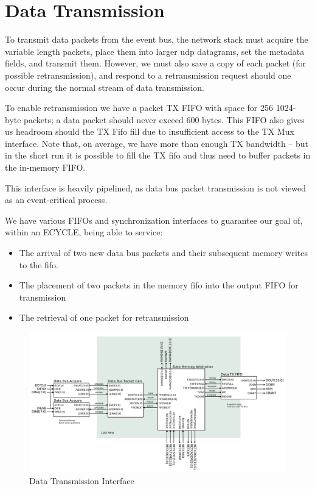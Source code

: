 \section{Data Transmission}

To transmit data packets from the event bus, the network stack must
acquire the variable length packets, place them into larger udp
datagrams, set the metadata fields, and transmit them. However, we
must also save a copy of each packet (for possible retransmission),
and respond to a retransmission request should one occur during the
normal stream of data transmission.

To enable retransmission we have a packet TX FIFO with space for 256
1024-byte packets; a data packet should never exceed 600 bytes. This
FIFO also gives us headroom should the TX Fifo fill due to
insufficient access to the TX Mux interface. Note that, on average, we
have more than enough TX bandwidth -- but in the short run it is
possible to fill the TX fifo and thus need to buffer packets in the
in-memory FIFO.

This interface is heavily pipelined, as data bus packet transmission
is not viewed as an event-critical process.

We have various FIFOs and synchronization interfaces to guarantee our
goal of, within an ECYCLE, being able to service:

\begin{itemize}
\item The arrival of two new data bus packets and their subsequent
  memory writes to the fifo.
\item The placement of two packets in the memory fifo into the output
  FIFO for transmission
\item The retrieval of one packet for retransmission
\end{itemize}

 \begin{figure}
\begin{centering}
\includegraphics[scale=0.7]{data.svg}
\end{centering}
\caption{Data Transmission Interface}
\label{data}
\end{figure}


